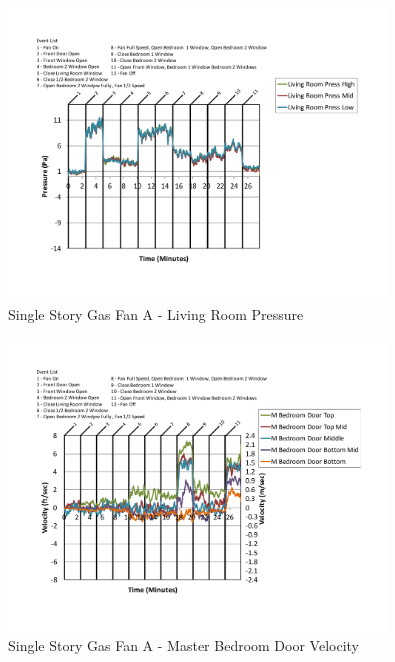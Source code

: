 \documentclass{article}
\begin{document}
\begin{appendices}
	\begin{figure}[H]
		\centering
		\includegraphics[height=3.05in,trim=0.67in 1.1in 0.67in 0.8in,clip=true]{0_Images/Results_Charts/ColdFlow/Single_Story/Gas/A/Living_Room_Pressure.pdf}
		\caption{Single Story Gas Fan A - Living Room Pressure}
	\end{figure}
 

	\begin{figure}[H]
		\centering
		\includegraphics[height=3.05in,trim=0.67in 1.1in 0.67in 0.8in,clip=true]{0_Images/Results_Charts/ColdFlow/Single_Story/Gas/A/Master_Bedroom_Door_Velocity.pdf}
		\caption{Single Story Gas Fan A - Master Bedroom Door Velocity}
	\end{figure}
 
	\clearpage


\end{appendices}
\end{document}
